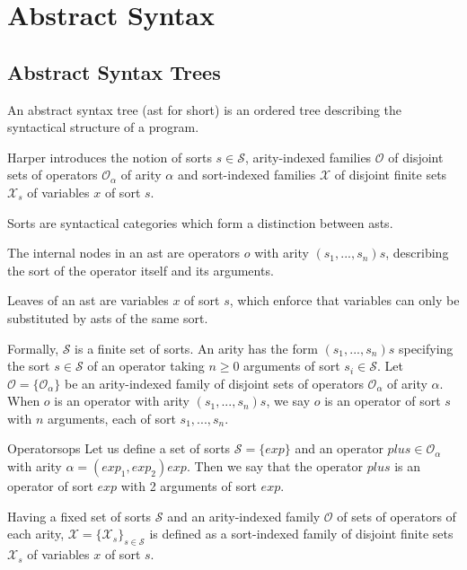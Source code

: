 
\section{Abstract Syntax}

\subsection{Abstract Syntax Trees}
An abstract syntax tree (ast for short) is an ordered tree describing the syntactical structure of a program.

Harper introduces the notion of sorts $s \in \mathcal{S}$, arity-indexed families $\mathcal{O}$ of disjoint sets of operators $\mathcal{O}_\alpha$ of arity $\alpha$ and sort-indexed families $\mathcal{X}$ of disjoint finite sets $\mathcal{X}_s$ of variables $x$ of sort $s$.

Sorts are syntactical categories which form a distinction between asts.

The internal nodes in an ast are operators $o$ with arity $(s_1,...,s_n)s$, describing the sort of the operator itself and its arguments.

Leaves of an ast are variables $x$ of sort $s$, which enforce that variables can only be substituted by asts of the same sort.

Formally,  $\mathcal{S}$ is a finite set of sorts. An arity has the form $(s_1,...,s_n)s$ specifying the sort $s \in \mathcal{S}$ of an operator taking $n \geq 0$ arguments of sort $s_i \in \mathcal{S}$. Let $\mathcal{O} = \{ \mathcal{O}_\alpha \}$ be an arity-indexed family of disjoint sets of operators $\mathcal{O}_\alpha$ of arity $\alpha$. When $o$ is an operator with arity $(s_1,...,s_n)s$, we say $o$ is an operator of sort $s$ with $n$ arguments, each of sort $s_1,...,s_n$.

\begin{example}{Operators}{ops}
    Let us define a set of sorts $\mathcal{S} = \{ exp \}$ and an operator $plus \in \mathcal{O}_\alpha$ with arity $\alpha = (exp_1,exp_2)exp$. Then we say that the operator $plus$ is an operator of sort $exp$ with 2 arguments of sort $exp$.
\end{example}

Having a fixed set of sorts $\mathcal{S}$ and an arity-indexed family $\mathcal{O}$ of sets of operators of each arity, $\mathcal{X} = \{ \mathcal{X}_s \}_{s \in \mathcal{S}}$ is defined as a sort-indexed family of disjoint finite sets $\mathcal{X}_s$ of variables $x$ of sort $s$.

